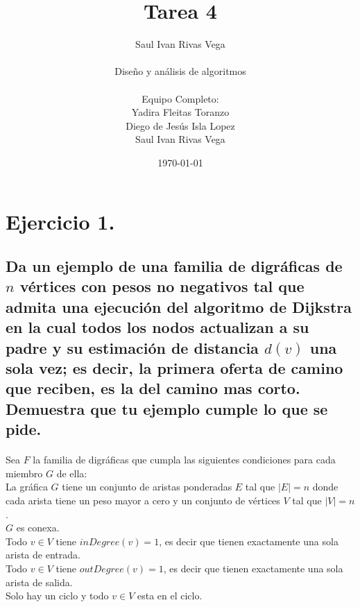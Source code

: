 \documentclass[12pt]{article}
\title{Tarea 4}
\author{
	Saul Ivan Rivas Vega \\
	\\
	Diseño y análisis de algoritmos\\
\\
	Equipo Completo:\\
		Yadira Fleitas Toranzo\\
		Diego de Jesús Isla Lopez\\
		Saul Ivan Rivas Vega\\
}
\date{\today}
\begin{document}
	\maketitle
	\pagebreak
	\section{Ejercicio 1.}
	\subsection{Da un ejemplo de una familia de digráficas de $n$ vértices con pesos no negativos tal que admita una ejecución del algoritmo de Dijkstra en la cual todos los nodos actualizan a su padre y su estimación de distancia $d(v)$ una sola vez; es decir, la primera oferta de camino que reciben, es la del camino mas corto. Demuestra que tu ejemplo cumple lo que se pide.}
	\paragraph{}Sea $F$ la familia de digráficas que cumpla las siguientes condiciones para cada miembro $G$ de ella:\\
	La gráfica $G$ tiene un conjunto de aristas ponderadas $E$ tal que $|E| = n$ donde cada arista tiene un peso mayor a cero y un conjunto de vértices $V$ tal que $|V| = n$.\\
	$G$ es conexa.\\
	Todo $v\in V$ tiene $inDegree(v) = 1$, es decir que tienen exactamente una sola arista de entrada.\\
	Todo $v\in V$ tiene $outDegree(v) = 1$, es decir que tienen exactamente una sola arista de salida. \\
	Solo hay un ciclo y todo $v\in V$ esta en el ciclo.
\end{document}
